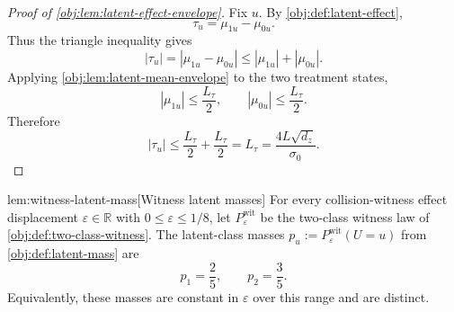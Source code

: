 \documentclass[11pt]{article}
\begin{document}
\begin{proof}[Proof of \cref{obj:lem:latent-effect-envelope}]
Fix \(u\). By \cref{obj:def:latent-effect},
\[
\tau_u=\mu_{1u}-\mu_{0u}.
\]
Thus the triangle inequality gives
\[
|\tau_u|
=
|\mu_{1u}-\mu_{0u}|
\le
|\mu_{1u}|+|\mu_{0u}|.
\] %
Applying \cref{obj:lem:latent-mean-envelope} to the two treatment states,
\[
|\mu_{1u}|\le \frac{L_\tau}{2},
\qquad
|\mu_{0u}|\le \frac{L_\tau}{2}.
\] %
Therefore
\[
|\tau_u|
\le
\frac{L_\tau}{2}+\frac{L_\tau}{2}
=
L_\tau
=
\frac{4L\sqrt{d_z}}{\sigma_0}.
\] %
\end{proof}

\begin{lemmav}{lem:witness-latent-mass}[Witness latent masses]
For every collision-witness effect displacement \(\varepsilon\in\mathbb R\) with \(0\le \varepsilon\le 1/8\), let \(P_{\varepsilon}^{\mathrm{wit}}\) be the two-class witness law of \cref{obj:def:two-class-witness}.  The latent-class masses \(p_u:=P_{\varepsilon}^{\mathrm{wit}}(U=u)\) from \cref{obj:def:latent-mass} are
\[
p_1=\frac25,
\qquad
p_2=\frac35 .
\]
Equivalently, these masses are constant in \(\varepsilon\) over this range and are distinct.
\end{lemmav}
\end{document}
